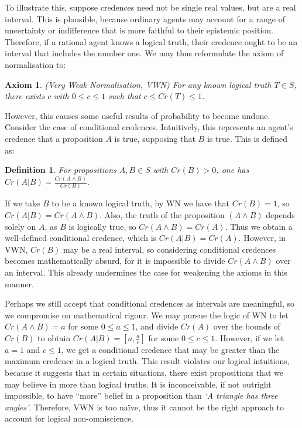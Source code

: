 \documentclass[12pt]{article}
\newtheorem{definition}{Definition}
\newtheorem{axiom}{Axiom}
\begin{document}
To illustrate this, suppose credences need not be single real values, but are a real interval. This is plausible, because ordinary agents may account for a range of uncertainty or indifference that is more faithful to their epistemic position. Therefore, if a rational agent knows a logical truth, their credence ought to be an interval that includes the number one.\autocite{sep} We may thus reformulate the axiom of normalisation to:
\begin{axiom}
    (Very Weak Normalisation, VWN) For any known logical truth $T\in S$, there exists $c$ with $0\leq c\leq 1$ such that $c\leq Cr(T)\leq1$.
\end{axiom}
However, this causes some useful results of probability to become undone. Consider the case of conditional credences. Intuitively, this represents an agent's credence that a proposition $A$ is true, supposing that $B$ is true.\autocite[32]{bdrc} This is defined as:
\begin{definition}
    For propositions $A,B\in S$ with $Cr(B)>0$, one has $Cr(A|B)=\frac{Cr(A\land B)}{Cr(B)}$.
\end{definition}
If we take $B$ to be a known logical truth, by WN we have that $Cr(B)=1$, so $Cr(A|B)=Cr(A\land B)$. Also, the truth of the proposition $(A\land B)$ depends solely on $A$, as $B$ is logically true, so $Cr(A\land B)=Cr(A)$. Thus we obtain a well-defined conditional credence, which is $Cr(A|B)=Cr(A)$. However, in VWN, $Cr(B)$ may be a real interval, so considering conditional credences becomes mathematically absurd, for it is impossible to divide $Cr(A\land B)$ over an interval. This already undermines the case for weakening the axioms in this manner.

Perhaps we still accept that conditional credences as intervals are meaningful, so we compromise on mathematical rigour. We may pursue the logic of WN to let $Cr(A\land B)=a$ for some $0\leq a\leq1$, and divide $Cr(A)$ over the bounds of $Cr(B)$ to obtain $Cr(A|B)=[a,\frac{a}{c}]$ for some $0\leq c\leq1$. However, if we let $a=1$ and $c\leq 1$, we get a conditional credence that may be greater than the maximum credence in a logical truth. This result violates our logical intuitions, because it suggests that in certain situations, there exist propositions that we may believe in more than logical truths. It is inconceivable, if not outright impossible, to have ``more'' belief in a proposition than \textit{`A triangle has three angles'}. Therefore, VWN is too na\"ive, thus it cannot be the right approach to account for logical non-omniscience.
\end{document}
